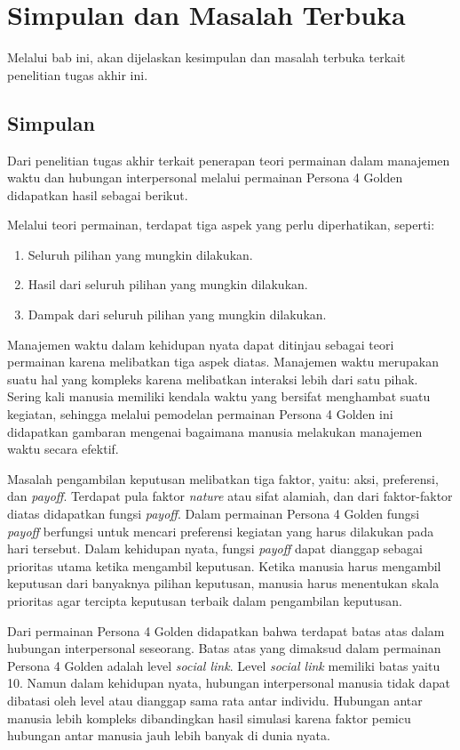 \chapter{Simpulan dan Masalah Terbuka}
Melalui bab ini, akan dijelaskan kesimpulan dan masalah terbuka terkait penelitian tugas akhir ini.

\section{Simpulan}
Dari penelitian tugas akhir terkait penerapan teori permainan dalam manajemen waktu dan hubungan interpersonal melalui permainan Persona 4 Golden didapatkan hasil sebagai berikut.

Melalui teori permainan, terdapat tiga aspek yang perlu diperhatikan, seperti:
\begin{enumerate}
    \item Seluruh pilihan yang mungkin dilakukan.
    \item Hasil dari seluruh pilihan yang mungkin dilakukan.
    \item Dampak dari seluruh pilihan yang mungkin dilakukan.
\end{enumerate}
Manajemen waktu dalam kehidupan nyata dapat ditinjau sebagai teori permainan karena melibatkan tiga aspek diatas. Manajemen waktu merupakan suatu hal yang kompleks karena melibatkan interaksi lebih dari satu pihak. Sering kali manusia memiliki kendala waktu yang bersifat menghambat suatu kegiatan, sehingga melalui pemodelan permainan Persona 4 Golden ini didapatkan gambaran mengenai bagaimana manusia melakukan manajemen waktu secara efektif.

Masalah pengambilan keputusan melibatkan tiga faktor, yaitu: aksi, preferensi, dan \textit{payoff}. Terdapat pula faktor \textit{nature} atau sifat alamiah, dan dari faktor-faktor diatas didapatkan fungsi \textit{payoff}. Dalam permainan Persona 4 Golden fungsi \textit{payoff} berfungsi untuk mencari preferensi kegiatan yang harus dilakukan pada hari tersebut. Dalam kehidupan nyata, fungsi \textit{payoff} dapat dianggap sebagai prioritas utama ketika mengambil keputusan. Ketika manusia harus mengambil keputusan dari banyaknya pilihan keputusan, manusia harus menentukan skala prioritas agar tercipta keputusan terbaik dalam pengambilan keputusan.

Dari permainan Persona 4 Golden didapatkan bahwa terdapat batas atas dalam hubungan interpersonal seseorang. Batas atas yang dimaksud dalam permainan Persona 4 Golden adalah level \textit{social link}. Level \textit{social link} memiliki batas yaitu 10. Namun dalam kehidupan nyata, hubungan interpersonal manusia tidak dapat dibatasi oleh level atau dianggap sama rata antar individu. Hubungan antar manusia lebih kompleks dibandingkan hasil simulasi karena faktor pemicu hubungan antar manusia jauh lebih banyak di dunia nyata.

